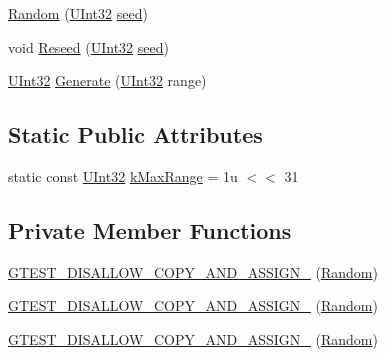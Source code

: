 \begin{DoxyCompactItemize}
\item 
\mbox{\hyperlink{classtesting_1_1internal_1_1_random_a6e112be5e7cce00551f6383025f69460}{Random}} (\mbox{\hyperlink{namespacetesting_1_1internal_a436defbb8e92c8e94e33ebcc86f278ba}{U\+Int32}} \mbox{\hyperlink{_input_8h_af0f2cc4946f88de776f7ffa35e382fcb}{seed}})
\item 
void \mbox{\hyperlink{classtesting_1_1internal_1_1_random_adf2f24199318a46f885c78f50d89a69e}{Reseed}} (\mbox{\hyperlink{namespacetesting_1_1internal_a436defbb8e92c8e94e33ebcc86f278ba}{U\+Int32}} \mbox{\hyperlink{_input_8h_af0f2cc4946f88de776f7ffa35e382fcb}{seed}})
\item 
\mbox{\hyperlink{namespacetesting_1_1internal_a436defbb8e92c8e94e33ebcc86f278ba}{U\+Int32}} \mbox{\hyperlink{classtesting_1_1internal_1_1_random_a9315b7fb621cbcfdf92ed4b5e584c0db}{Generate}} (\mbox{\hyperlink{namespacetesting_1_1internal_a436defbb8e92c8e94e33ebcc86f278ba}{U\+Int32}} range)
\end{DoxyCompactItemize}
\subsection*{Static Public Attributes}
\begin{DoxyCompactItemize}
\item 
static const \mbox{\hyperlink{namespacetesting_1_1internal_a436defbb8e92c8e94e33ebcc86f278ba}{U\+Int32}} \mbox{\hyperlink{classtesting_1_1internal_1_1_random_ad378599ead1173525f1d44b458a3450a}{k\+Max\+Range}} = 1u $<$$<$ 31
\end{DoxyCompactItemize}
\subsection*{Private Member Functions}
\begin{DoxyCompactItemize}
\item 
\mbox{\hyperlink{classtesting_1_1internal_1_1_random_aa2f476d8cfe29f928b90d7339c849734}{G\+T\+E\+S\+T\+\_\+\+D\+I\+S\+A\+L\+L\+O\+W\+\_\+\+C\+O\+P\+Y\+\_\+\+A\+N\+D\+\_\+\+A\+S\+S\+I\+G\+N\+\_\+}} (\mbox{\hyperlink{classtesting_1_1internal_1_1_random}{Random}})
\item 
\mbox{\hyperlink{classtesting_1_1internal_1_1_random_aa2f476d8cfe29f928b90d7339c849734}{G\+T\+E\+S\+T\+\_\+\+D\+I\+S\+A\+L\+L\+O\+W\+\_\+\+C\+O\+P\+Y\+\_\+\+A\+N\+D\+\_\+\+A\+S\+S\+I\+G\+N\+\_\+}} (\mbox{\hyperlink{classtesting_1_1internal_1_1_random}{Random}})
\item 
\mbox{\hyperlink{classtesting_1_1internal_1_1_random_aa2f476d8cfe29f928b90d7339c849734}{G\+T\+E\+S\+T\+\_\+\+D\+I\+S\+A\+L\+L\+O\+W\+\_\+\+C\+O\+P\+Y\+\_\+\+A\+N\+D\+\_\+\+A\+S\+S\+I\+G\+N\+\_\+}} (\mbox{\hyperlink{classtesting_1_1internal_1_1_random}{Random}})
\end{DoxyCompactItemize}
